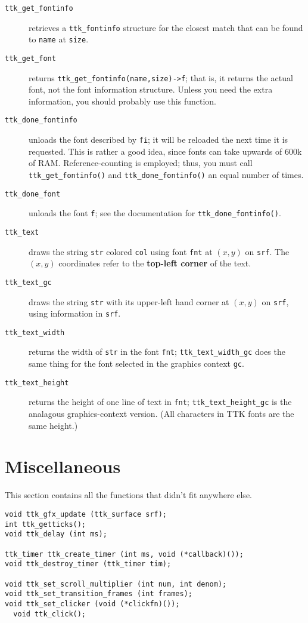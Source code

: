 \documentclass[12pt,letterpaper]{report}
\let\ttt\tt
\def\tt{\def\_{{\ttt\char`\_}}\ttt}
\begin{document}
\begin{description}
\item[{\tt ttk_get_fontinfo}] retrieves a \verb|ttk_fontinfo| structure for the closest match that
can be found to \verb|name| at \verb|size|.
\item[{\tt ttk_get_font}] returns \verb|ttk_get_fontinfo(name,size)->f|; that is, it returns the
actual font, not the font information structure. Unless you need the extra information, you should
probably use this function.
\item[{\tt ttk_done_fontinfo}] unloads the font described by \verb|fi|; it will be reloaded the next time
it is requested. This is rather a good idea, since fonts can take upwards of 600k of RAM. Reference-counting is
employed; thus, you must call \verb|ttk_get_fontinfo()| and \verb|ttk_done_fontinfo()| an equal number of times.
\item[{\tt ttk_done_font}] unloads the font \verb|f|; see the documentation for \verb|ttk_done_fontinfo()|.
\item[{\tt ttk_text}] draws the string \verb|str| colored \verb|col| using font \verb|fnt| at $(x,y)$ on \verb|srf|.
The $(x,y)$ coordinates refer to the {\bf top-left corner} of the text.
\item[{\tt ttk_text_gc}] draws the string \verb|str| with its upper-left hand corner at $(x,y)$ on \verb|srf|,
using information in \verb|srf|.
\item[{\tt ttk_text_width}] returns the width of \verb|str| in the font \verb|fnt|; \verb|ttk_text_width_gc|
does the same thing for the font selected in the graphics context \verb|gc|.
\item[{\tt ttk_text_height}] returns the height of one line of text in \verb|fnt|; \verb|ttk_text_height_gc|
is the analagous graphics-context version. (All characters in TTK fonts are the same height.)
\end{description}

\section{Miscellaneous}
This section contains all the functions that didn't fit anywhere else.

\begin{verbatim}
void ttk_gfx_update (ttk_surface srf);
int ttk_getticks();
void ttk_delay (int ms);

ttk_timer ttk_create_timer (int ms, void (*callback)());
void ttk_destroy_timer (ttk_timer tim);

void ttk_set_scroll_multiplier (int num, int denom);
void ttk_set_transition_frames (int frames);
void ttk_set_clicker (void (*clickfn)());
  void ttk_click();
\end{verbatim}
\end{document}
